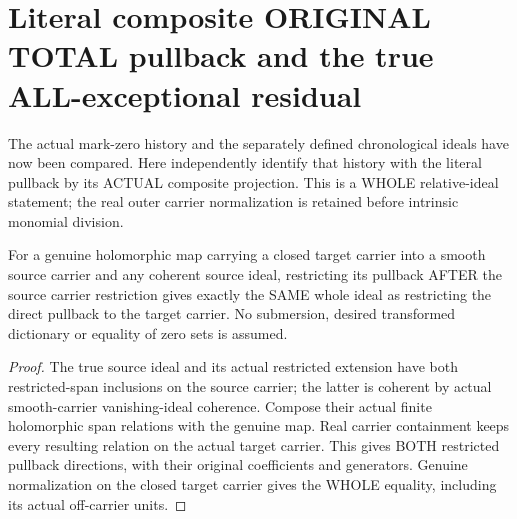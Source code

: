 \section{Literal composite ORIGINAL TOTAL pullback and the true ALL-exceptional residual}

The actual mark-zero history and the separately defined chronological
ideals have now been compared. Here independently identify that history
with the literal pullback by its ACTUAL composite projection. This is a
WHOLE relative-ideal statement; the real outer carrier normalization is
retained before intrinsic monomial division.

\begin{lemma}
\label{hir:sharp-actual-composite-total-normalized-pullback}
\leanok
For a genuine holomorphic map carrying a closed target carrier into a
smooth source carrier and any coherent source ideal, restricting its
pullback AFTER the source carrier restriction gives exactly the SAME
whole ideal as restricting the direct pullback to the target carrier.
No submersion, desired transformed dictionary or equality of zero sets is
assumed.
\end{lemma}
\begin{proof}
The true source ideal and its actual restricted extension have both
restricted-span inclusions on the source carrier; the latter is coherent
by actual smooth-carrier vanishing-ideal coherence. Compose their actual
finite holomorphic span relations with the genuine map. Real carrier
containment keeps every resulting relation on the actual target carrier.
This gives BOTH restricted pullback directions, with their original
coefficients and generators. Genuine normalization on the closed target
carrier gives the WHOLE equality, including its actual off-carrier units.
\end{proof}

